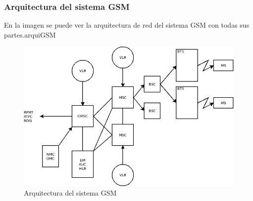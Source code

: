 \subsubsection{Arquitectura del sistema GSM}
\label{ssub:arquiGSM}
En la imagen se puede ver la arquitectura de red del sistema GSM con todas sus partes.arquiGSM
\begin{figure}[H]
\centering
\includegraphics[width=\textwidth]{Imagen/diaGSM.jpg}
\caption{Arquitectura del sistema GSM}
\label{img:arquiGSM}
\end{figure}
